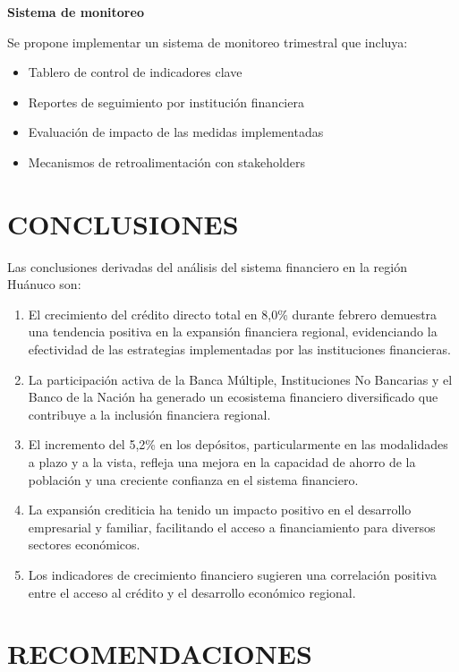 \documentclass[12pt, a4paper]{article}
\begin{document}
\textbf{Sistema de monitoreo}

Se propone implementar un sistema de monitoreo trimestral que incluya:
\begin{itemize}
    \item Tablero de control de indicadores clave
    \item Reportes de seguimiento por institución financiera
    \item Evaluación de impacto de las medidas implementadas
    \item Mecanismos de retroalimentación con stakeholders
\end{itemize}

\section{CONCLUSIONES}

Las conclusiones derivadas del análisis del sistema financiero en la región Huánuco son:

\begin{enumerate}
    \item El crecimiento del crédito directo total en 8,0\% durante febrero demuestra una tendencia positiva en la expansión financiera regional, evidenciando la efectividad de las estrategias implementadas por las instituciones financieras.

    \item La participación activa de la Banca Múltiple, Instituciones No Bancarias y el Banco de la Nación ha generado un ecosistema financiero diversificado que contribuye a la inclusión financiera regional.

    \item El incremento del 5,2\% en los depósitos, particularmente en las modalidades a plazo y a la vista, refleja una mejora en la capacidad de ahorro de la población y una creciente confianza en el sistema financiero.

    \item La expansión crediticia ha tenido un impacto positivo en el desarrollo empresarial y familiar, facilitando el acceso a financiamiento para diversos sectores económicos.

    \item Los indicadores de crecimiento financiero sugieren una correlación positiva entre el acceso al crédito y el desarrollo económico regional.
\end{enumerate}

\section{RECOMENDACIONES}
\end{document}
